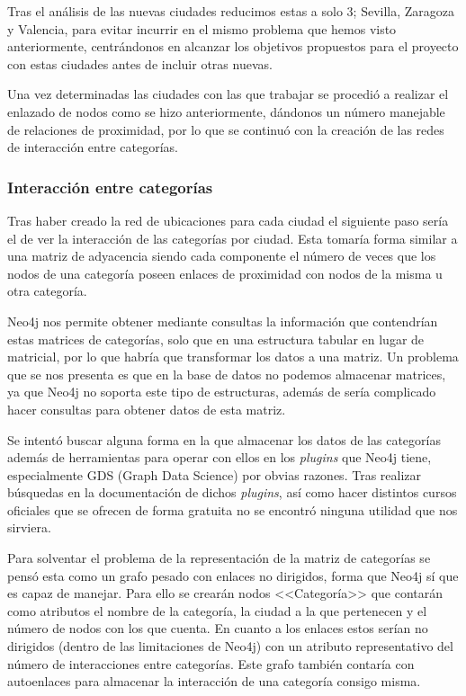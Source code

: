 Tras el análisis de las nuevas ciudades reducimos estas a solo 3; Sevilla, Zaragoza y Valencia, para evitar incurrir en el mismo problema que hemos visto anteriormente, centrándonos en alcanzar los objetivos propuestos para el proyecto con estas ciudades antes de incluir otras nuevas.

Una vez determinadas las ciudades con las que trabajar se procedió a realizar el enlazado de nodos como se hizo anteriormente, dándonos un número manejable de relaciones de proximidad, por lo que se continuó con la creación de las redes de interacción entre categorías.

\subsubsection{Interacción entre categorías}

Tras haber creado la red de ubicaciones para cada ciudad el siguiente paso sería el de ver la interacción de las categorías por ciudad. Esta tomaría forma similar a una matriz de adyacencia siendo cada componente el número de veces que los nodos de una categoría poseen enlaces de proximidad con nodos de la misma u otra categoría.


Neo4j nos permite obtener mediante consultas la información que contendrían estas matrices de categorías, solo que en una estructura tabular en lugar de matricial, por lo que habría que transformar los datos a una matriz. Un problema que se nos presenta es que en la base de datos no podemos almacenar matrices, ya que Neo4j no soporta este tipo de estructuras, además de sería complicado hacer consultas para obtener datos de esta matriz.

Se intentó buscar alguna forma en la que almacenar los datos de las categorías además de herramientas para operar con ellos en los \textit{plugins} que Neo4j tiene, especialmente GDS (Graph Data Science) por obvias razones. Tras realizar búsquedas en la documentación de dichos \textit{plugins}, así como hacer distintos cursos oficiales que se ofrecen de forma gratuita no se encontró ninguna utilidad que nos sirviera.

Para solventar el problema de la representación de la matriz de categorías se pensó esta como un grafo pesado con enlaces no dirigidos, forma que Neo4j sí que es capaz de manejar. Para ello se crearán nodos <<Categoría>> que contarán como atributos el nombre de la categoría, la ciudad a la que pertenecen y el número de nodos con los que cuenta. En cuanto a los enlaces estos serían no dirigidos (dentro de las limitaciones de Neo4j) con un atributo representativo del número de interacciones entre categorías. Este grafo también contaría con autoenlaces para almacenar la interacción de una categoría consigo misma. 

